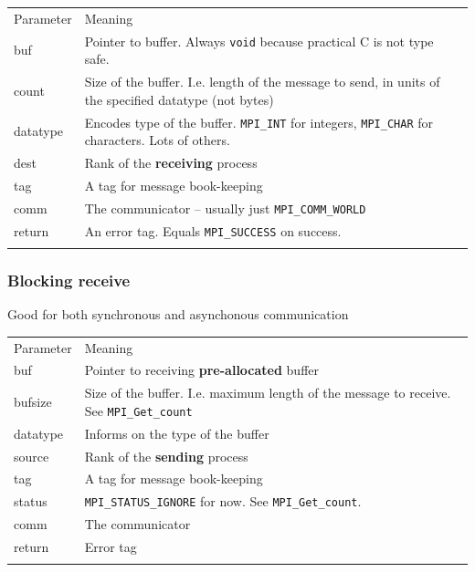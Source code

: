 \begin{longtable}[c]{@{}ll@{}}
\toprule\addlinespace
Parameter & Meaning
\\\addlinespace
\midrule\endhead
buf & Pointer to buffer. Always \texttt{void} because practical C is not
type safe.
\\\addlinespace
count & Size of the buffer. I.e. length of the message to send, in units
of the specified datatype (not bytes)
\\\addlinespace
datatype & Encodes type of the buffer. \texttt{MPI\_INT} for integers,
\texttt{MPI\_CHAR} for characters. Lots of others.
\\\addlinespace
dest & Rank of the \textbf{receiving} process
\\\addlinespace
tag & A tag for message book-keeping
\\\addlinespace
comm & The communicator -- usually just \texttt{MPI\_COMM\_WORLD}
\\\addlinespace
return & An error tag. Equals \texttt{MPI\_SUCCESS} on success.
\\\addlinespace
\bottomrule
\end{longtable}

\subsubsection{Blocking receive}\label{blocking-receive}

\begin{Shaded}
\begin{Highlighting}[]
     
\end{Highlighting}
\end{Shaded}

Good for both synchronous and asynchonous communication

\begin{longtable}[c]{@{}ll@{}}
\toprule\addlinespace
Parameter & Meaning
\\\addlinespace
\midrule\endhead
buf & Pointer to receiving \textbf{pre-allocated} buffer
\\\addlinespace
bufsize & Size of the buffer. I.e. maximum length of the message to
receive. See \texttt{MPI\_Get\_count}
\\\addlinespace
datatype & Informs on the type of the buffer
\\\addlinespace
source & Rank of the \textbf{sending} process
\\\addlinespace
tag & A tag for message book-keeping
\\\addlinespace
status & \texttt{MPI\_STATUS\_IGNORE} for now. See
\texttt{MPI\_Get\_count}.
\\\addlinespace
comm & The communicator
\\\addlinespace
return & Error tag
\\\addlinespace
\bottomrule
\end{longtable}

